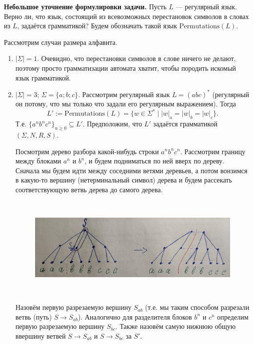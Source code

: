 \documentclass[12pt,a4paper]{article}
\begin{document}
    \begin{problem}{8}
        \newcommand{\Permutations}{\mathrm{Permutations}}
        \textbf{Небольшое уточнение формулировки задачи.} Пусть $L$ --- регулярный язык. Верно ли, что язык, состоящий из всевозможных перестановок символов в словах из $L$, задаётся грамматикой? Будем обозначать такой язык $\Permutations(L)$.

        Рассмотрим случаи размера алфавита.
        \begin{enumerate}
            \item $|\Sigma| = 1$. Очевидно, что перестановки символов в слове ничего не делают, поэтому просто грамматизации автомата хватит, чтобы породить искомый язык грамматикой.

            \item $|\Sigma| = 3$; $\Sigma = \{a; b; c\}$. Рассмотрим регулярный язык $L = (abc)^*$ (регулярный он потому, что мы только что задали его регулярным выражением). Тогда
                \[L' := \Permutations(L) = \{w \in \Sigma^* \mid |w|_a = |w|_b = |w|_c\}.\]
                Т.е. $\{a^n b^n c^n\}_{n \geqslant 0} \subseteq L'$. Предположим, что $L'$ задаётся грамматикой $(\Sigma, N, R, S)$.
                
                Посмотрим дерево разбора какой-нибудь строки $a^n b^n c^n$. Рассмотрим границу между блоками $a^n$ и $b^n$, и будем подниматься по ней вверх по дереву. Сначала мы будем идти между соседними ветями деревьев, а потом вонзимся в какую-то вершину (нетерминальный символ) дерева и будем рассекать соответствующую ветвь дерева до самого дерева.
                \begin{figure}[H]
                    \centering
                    \includegraphics[height=5cm]{TI-HW-006-2.jpg}
                \end{figure}
                Назовём первую разрезаемую вершину $S_{ab}$ (т.е. мы таким способом разрезали ветвь (путь) $S \to S_{ab}$). Аналогично для разделителя блоков $b^n$ и $c^n$ определим первую разрезаемую вершину $S_{bc}$. Также назовём самую нижнюю общую ввершину ветвей $S \to S_{ab}$ и $S \to S_{bc}$ за $S'$.
                

\end{enumerate}
\end{problem}
\end{document}

